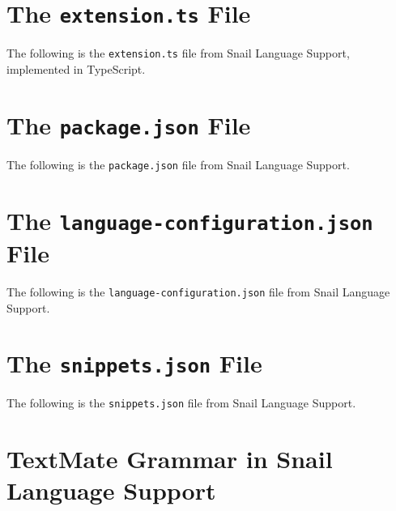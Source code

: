 \documentclass{article}
\begin{document}
\begin{appendices}

\section{The \lstinline{extension.ts} File}

    The following is the \lstinline{extension.ts} file from Snail Language Support, implemented in TypeScript.

    
    \label{app:extension-ts}

\newpage
\section{The \lstinline{package.json} File}

    The following is the \lstinline{package.json} file from Snail Language Support.
    
    \label{app:package-json}

\newpage
\section{The \lstinline{language-configuration.json} File}

    The following is the \lstinline{language-configuration.json} file from Snail Language Support.
    
    \label{app:language-configuration}

\newpage
\section{The \lstinline{snippets.json} File}

    The following is the \lstinline{snippets.json} file from Snail Language Support.
    
    \label{app:snippets-json}

\newpage
\section{TextMate Grammar in Snail Language Support}


\end{appendices}
\end{document}
